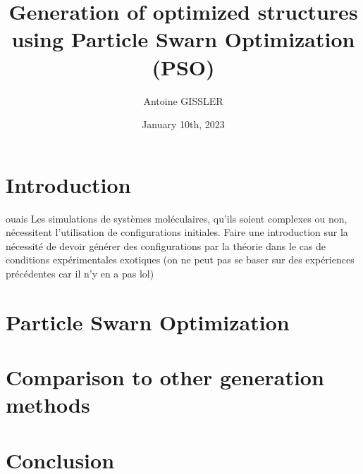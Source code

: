 \documentclass[11pt]{article}
\title{\textbf{Generation of optimized structures using Particle Swarn Optimization (PSO)}}
\author{Antoine GISSLER}
\date{January 10th, 2023}
\begin{document}
\maketitle

\section{Introduction}
ouais \cite{original}
Les simulations de systèmes moléculaires, qu'ils soient complexes ou non, nécessitent l'utilisation de configurations initiales. 
Faire une introduction sur la nécessité de devoir générer des configurations par la théorie dans le cas de conditions expérimentales exotiques (on ne peut pas se baser sur des expériences précédentes car il n'y en a pas lol)
\section{Particle Swarn Optimization}

\section{Comparison to other generation methods}

\section{Conclusion}



\end{document}

